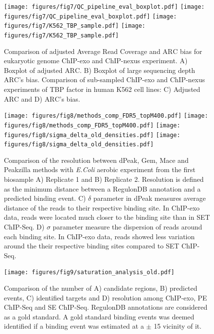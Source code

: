 \documentclass{bmcart}
\begin{document}
\newpage

\begin{figure}[h!]
  \centering
  \texttt{[image: figures/fig7/QC\_pipeline\_eval\_boxplot.pdf]}
\newline
  \texttt{[image: figures/fig7/QC\_pipeline\_eval\_boxplot.pdf]}
\newline
  \texttt{[image: figures/fig7/K562\_TBP\_sample.pdf]}
  \texttt{[image: figures/fig7/K562\_TBP\_sample.pdf]}
  \caption{Comparison of adjusted Average Read Coverage and
    $\mbox{ARC}$ bias for eukaryotic genome ChIP-exo and ChIP-nexus
    experiment. A) Boxplot of adjusted $\mbox{ARC}$. B) Boxplot of
    large sequencing depth $\mbox{ARC}$'s bias. Comparison of
    sub-sampled ChIP-exo and ChIP-nexus experiments of TBP factor in
    human K562 cell lines: C) Adjusted $\mbox{ARC}$ and D) $\mbox{ARC}$'s
    bias.}
  \label{fig:eval}
\end{figure}

\newpage

\begin{figure}[h!]
  \centering
  \texttt{[image: figures/fig8/methods\_comp\_FDR5\_topM400.pdf]}
  \texttt{[image: figures/fig8/methods\_comp\_FDR5\_topM400.pdf]}
   \texttt{[image: figures/fig8/sigma\_delta\_old\_densities.pdf]}
   \texttt{[image: figures/fig8/sigma\_delta\_old\_densities.pdf]}   
  \caption{Comparison of the resolution between dPeak, Gem, Mace and
    Peakzilla methods with \emph{E.Coli} aerobic experiment from the
    first biosample A) Replicate 1 and B) Replicate 2. Resolution is
    defined as the minimum distance between a RegulonDB annotation and
    a predicted binding event. C) $\delta$ parameter in dPeak measures
    average distance of the reads to their respective binding site. In
    ChIP-exo data, reads were located much closer to the binding site
    than in SET ChIP-Seq. D) $\sigma$ parameter measure the dispersion
    of reads around each binding site. In ChIP-exo data, reads showed
    less variation around the their respective binding sites compared
    to SET ChIP-Seq.}
  \label{fig:methods_comp}
\end{figure}

\newpage

\begin{figure}[h]
  \centering
  \texttt{[image: figures/fig9/saturation\_analysis\_old.pdf]}
  \caption{Comparison of the number of A) candidate regions, B)
    predicted events, C) identified targets and D) resolution among
    ChIP-exo, PE ChIP-Seq and SE ChIP-Seq. RegulonDB annotations are
    considered as a gold standard. A gold standard binding events was
    deemed identified if a binding event was estimated at a $\pm$ 15
    vicinity of it.}
  \label{fig:design}
\end{figure}
\end{document}
